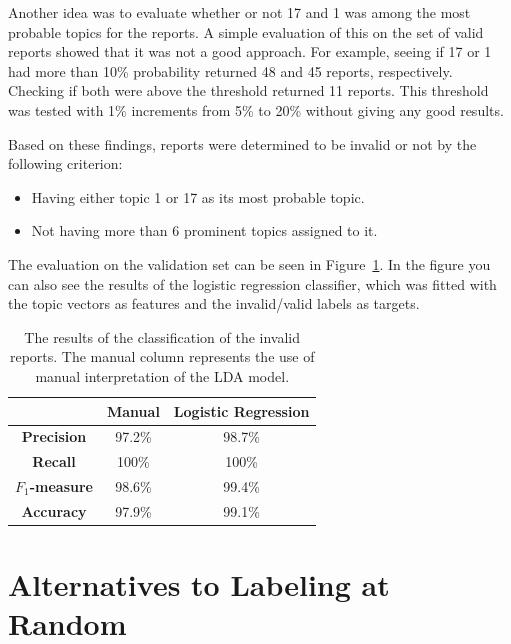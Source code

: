 Another idea was to evaluate whether or not 17 and 1 was among the most probable topics for the reports.
A simple evaluation of this on the set of valid reports showed that it was not a good approach.
For example, seeing if 17 or 1 had more than 10\% probability returned 48 and 45 reports, respectively.
Checking if both were above the threshold returned 11 reports.
This threshold was tested with 1\% increments from 5\% to 20\% without giving any good results.

Based on these findings, reports were determined to be invalid or not by the following criterion:
\begin{itemize}
    \item Having either topic 1 or 17 as its most probable topic.
    \item Not having more than 6 prominent topics assigned to it.
\end{itemize}

The evaluation on the validation set can be seen in Figure~\ref{tab:exp1-eval}.
In the figure you can also see the results of the logistic regression classifier, which was fitted with the topic vectors as features and the invalid/valid labels as targets.

\begin{table}[h!]
    \centering
    \begin{tabular}{|c|cc|}
        \hline
        & \textbf{Manual} & \textbf{Logistic Regression} \\
        \hline
        \textbf{Precision} & 97.2\% & 98.7\% \\
        \textbf{Recall} & 100\% & 100\% \\
        \textbf{$F_1$-measure} & 98.6\% & 99.4\%\\
        \textbf{Accuracy} & 97.9\% & 99.1\%\\
        \hline
    \end{tabular}
    \caption{The results of the classification of the invalid reports. The manual column represents the use of manual interpretation of the LDA model.}
    \label{tab:exp1-eval}
\end{table}

\section{Alternatives to Labeling at Random}


